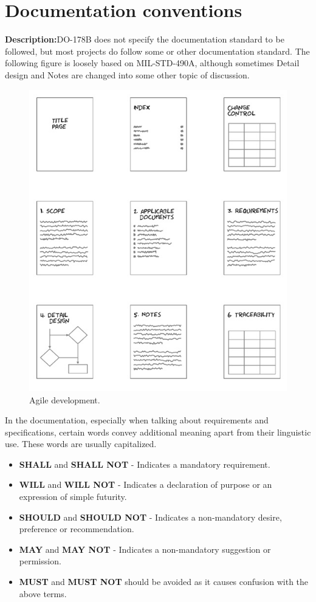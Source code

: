 \documentclass[a4paper]{article}
\begin{document}
\section{Documentation conventions}
\textbf{Description:}DO-178B does not specify the documentation standard to be followed, but most projects do follow some or other documentation standard. The following figure is loosely based on MIL-STD-490A, although sometimes Detail design and Notes are changed into some other topic of discussion.\\

\begin{center}
\begin{figure}[h]
\centering
\includegraphics[width=0.7\linewidth]{./pictures/image1.jpg}
\caption{\label{fig:Agile}Agile development.}
\end{figure}
\end{center}

In the documentation, especially when talking about requirements and specifications, certain words convey additional meaning apart from their linguistic use. These words are usually capitalized.\\
\begin{itemize}
\item \textbf{SHALL} and \textbf{SHALL NOT} - Indicates a mandatory requirement.
\item \textbf{WILL} and \textbf{WILL NOT} - Indicates a declaration of purpose or an expression of simple futurity.
\item \textbf{SHOULD} and \textbf{SHOULD NOT} - Indicates a non-mandatory desire, preference or recommendation.
\item \textbf{MAY} and \textbf{MAY NOT} - Indicates a non-mandatory suggestion or permission.
\item \textbf{MUST} and \textbf{MUST NOT} should be avoided as it causes confusion with the above terms. 
\end{itemize}
\end{document}
